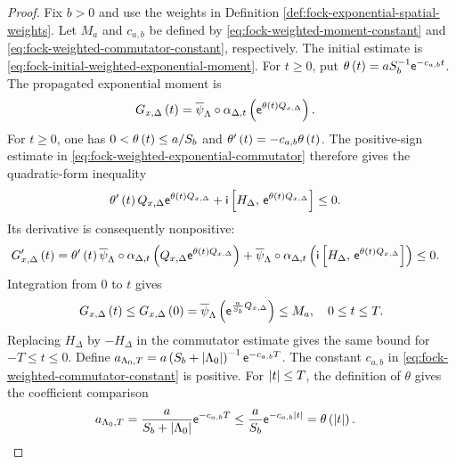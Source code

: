 \documentclass[11pt,a4paper]{article}
\theoremstyle{plain}
\theoremstyle{definition}
\theoremstyle{remark}
\begin{document}
\begin{proof}
Fix $b>0$ and use the weights in Definition \ref{def:fock-exponential-spatial-weights}.
Let $M_a$ and $c_{a,b}$ be defined by
\eqref{eq:fock-weighted-moment-constant} and \eqref{eq:fock-weighted-commutator-constant}, respectively.
The initial estimate is \eqref{eq:fock-initial-weighted-exponential-moment}.
For $t \geq 0$, put $\theta \left( t \right)=aS_b^{-1}\mathsf{e}^{-c_{a,b}t}$.
The propagated exponential moment is
$$\begin{aligned}
\fun{G_{x,\Delta}}{t}
& =
\fun{\oastate[\overline{\psi}_{\Lambda}] \circ \alpha_{\Delta,t}}
{\napiernum^{\fun{\theta}{t}Q_{x,\Delta}}}.
\end{aligned}$$
For $t\geq0$, one has $0<\theta \left( t \right)\leq a/S_b$ and
$\theta' \left( t \right)=-c_{a,b}\theta \left( t \right)$.
The positive-sign estimate in \eqref{eq:fock-weighted-exponential-commutator} therefore gives the
quadratic-form inequality
$$\begin{aligned}
\fun{\theta'}{t}Q_{x,\Delta}\napiernum^{\fun{\theta}{t}Q_{x,\Delta}}
+
\imunit\commutator{H_{\Delta}}{\napiernum^{\fun{\theta}{t}Q_{x,\Delta}}}
& \leq
0.
\end{aligned}$$
Its derivative is consequently nonpositive:
$$\begin{aligned}
\fun{G_{x,\Delta}'}{t}
& =
\fun{\theta'}{t}
\fun{\oastate[\overline{\psi}_{\Lambda}] \circ \alpha_{\Delta,t}}
{Q_{x,\Delta}\napiernum^{\fun{\theta}{t}Q_{x,\Delta}}}
+
\fun{\oastate[\overline{\psi}_{\Lambda}] \circ \alpha_{\Delta,t}}
{\imunit\commutator{H_{\Delta}}
{\napiernum^{\fun{\theta}{t}Q_{x,\Delta}}}}
\leq
0.
\end{aligned}$$
Integration from $0$ to $t$ gives
$$\begin{aligned}
\fun{G_{x,\Delta}}{t}
\leq
\fun{G_{x,\Delta}}{0}
=
\fun{\oastate[\overline{\psi}_{\Lambda}]}
{\napiernum^{\frac{a}{S_b}Q_{x,\Delta}}}
\leq
M_a,
\quad
0\leq t\leq T.
\end{aligned}$$
Replacing $H_{\Delta}$ by $-H_{\Delta}$ in the commutator estimate gives the same bound for $-T\leq t\leq0$.
Define
$a_{\Lambda_0,T}=a\left( S_b+\left| \Lambda_0 \right| \right)^{-1}\mathsf{e}^{-c_{a,b}T}$.
The constant $c_{a,b}$ in \eqref{eq:fock-weighted-commutator-constant} is positive.
For $\left| t \right|\leq T$, the definition of $\theta$ gives the coefficient comparison
$$\begin{aligned}
a_{\Lambda_0,T}
& =
\frac{a}{S_b+\left| \Lambda_0 \right|}
\mathsf{e}^{-c_{a,b}T}
\leq
\frac{a}{S_b}
\mathsf{e}^{-c_{a,b}\left| t \right|}
=
\theta \left( \left| t \right| \right).
\end{aligned}$$

\end{proof}
\end{document}
